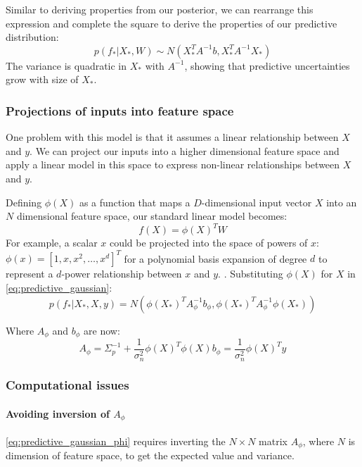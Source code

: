Similar to deriving properties from our posterior, we can rearrange this expression and complete the square to derive the properties of our predictive distribution:
\begin{equation} \label{eq:predictive_gaussian}
    p(f_*|X_*,W) \sim N(X_*^TA^{-1}b, X_*^TA^{-1}X_*)
\end{equation}
The variance is quadratic in $X_*$ with $A^{-1}$, showing that predictive uncertainties grow with size of $X_*$.

\subsubsection{Projections of inputs into feature space}
One problem with this model is that it assumes a linear relationship between $X$ and $y$. We can project our inputs into a higher dimensional feature space and apply a linear model in this space to express non-linear relationships between $X$ and $y$. 

Defining $\phi(X)$ as a function that maps a $D$-dimensional input vector $X$ into an $N$ dimensional feature space, our standard linear model becomes:
\begin{equation*}
    f(X) = \phi(X)^T W
\end{equation*}
For example, a scalar $x$ could be projected into the space of powers of $x$: $\phi(x) = [1, x, x^2, \ldots, x^d]^T$ for a polynomial basis expansion of degree $d$ to represent a $d$-power relationship between $x$ and $y$.
.
Substituting $\phi(X)$ for $X$ in \ref{eq:predictive_gaussian}:
\begin{equation} \label{eq:predictive_gaussian_phi}
    p(f_*|X_*,X,y) = N(\phi(X_*)^TA_{\phi}^{-1}b_{\phi} , \phi(X_*)^TA_{\phi}^{-1}\phi(X_*))
\end{equation}

Where $A_{\phi}$ and $b_{\phi}$ are now:
\begin{equation*}
    A_{\phi} = \Sigma_p^{-1} + \frac{1}{\sigma^2_n}\phi(X)^T\phi(X)
    b_{\phi} = \frac{1}{\sigma^2_n}\phi(X)^Ty
\end{equation*}

\subsubsection{Computational issues}
\paragraph{Avoiding inversion of $A_{\phi}$}
\ref{eq:predictive_gaussian_phi} requires inverting the $N \times N$ matrix $A_{\phi}$, where $N$ is dimension of feature space, to get the expected value and variance. 

